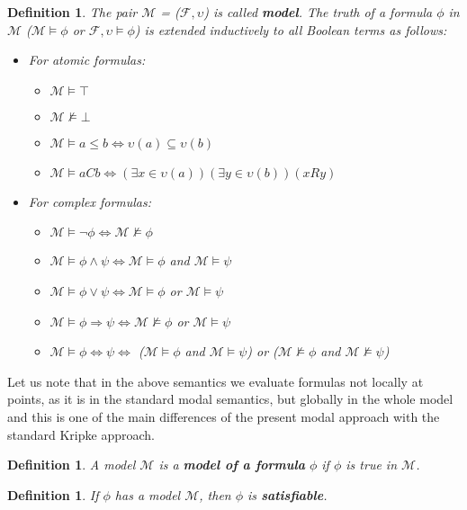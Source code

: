 \documentclass{article}
\newcommand\M{\mathcal{M}}
\newcommand\F{\mathcal{F}}
\newtheorem{defn}[theorem]{Definition}
\begin{document}
	\begin{defn}
		The pair $\M$ = ($\F, \upsilon$) is called \textbf{\textit{model}}. The truth of a formula $\phi$ in $\M$ ($\M \models \phi$ or $\F, \upsilon \models \phi$) is extended inductively to all Boolean terms as follows:
		\begin{itemize}
			\item For atomic formulas:
				\begin{itemize}
					\item $\M \models \top$
					\item $\M \not\models \bot$
					\item $\M \models a \leq b \iff \upsilon(a) \subseteq \upsilon(b)$
					\item $\M \models aCb \iff (\exists x \in \upsilon(a))(\exists y \in \upsilon(b))(xRy)$
				\end{itemize}
			\item For complex formulas:
				\begin{itemize}
					\item $\M \models \neg \phi \iff \M \not\models \phi$
					\item $\M \models \phi \land \psi \iff \M \models \phi$ and $\M \models \psi$
					\item $\M \models \phi \lor \psi \iff \M \models \phi$ or $\M \models \psi$
					\item $\M \models \phi \Rightarrow \psi \iff \M \not\models \phi$ or $\M \models \psi$
					\item $\M \models \phi \Leftrightarrow \psi \iff$ ($\M \models \phi$ and $\M \models \psi$) or ($\M \not\models \phi$ and $\M \not\models \psi$)
				\end{itemize}
		\end{itemize}
	\end{defn}
	\par
	Let us note that in the above semantics we evaluate formulas not locally at points, as it is in the standard modal semantics, but globally in the whole model and this is one of the main differences of the present modal approach with the standard Kripke approach.

	\begin{defn}
		A model $\M$ is a \textit{\textbf{model of a formula}} $\phi$ if $\phi$ is \textit{true} in $\M$.
	\end{defn}

	\begin{defn}
		If $\phi$ has a model $\M$, then $\phi$ is \textbf{satisfiable}.
	\end{defn}
\end{document}
